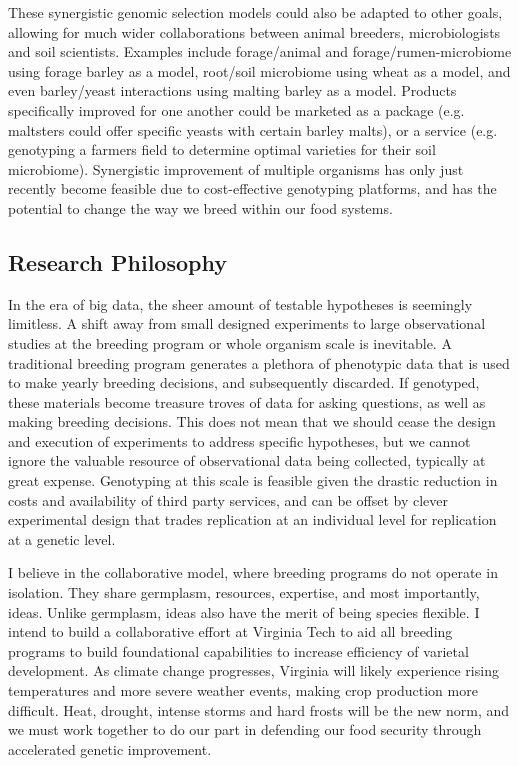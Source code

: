 \documentclass[11pt]{article}
\begin{document}
These synergistic genomic selection models could also be adapted to other goals, allowing for much wider collaborations between animal breeders, microbiologists and soil scientists. Examples include forage/animal and forage/rumen-microbiome using forage barley as a model, root/soil microbiome using wheat as a model, and even barley/yeast interactions using malting barley as a model. Products specifically improved for one another could be marketed as a package (e.g. maltsters could offer specific yeasts with certain barley malts), or a service (e.g. genotyping a farmers field to determine optimal varieties for their soil microbiome). Synergistic improvement of multiple organisms has only just recently become feasible due to cost-effective genotyping platforms, and has the potential to change the way we breed within our food systems. 



\subsection*{Research Philosophy}

In the era of big data, the sheer amount of testable hypotheses is seemingly limitless. A shift away from small designed experiments to large observational studies at the breeding program or whole organism scale is inevitable. A traditional breeding program generates a plethora of phenotypic data that is used to make yearly breeding decisions, and subsequently discarded. If genotyped, these materials become treasure troves of data for asking questions, as well as making breeding decisions. This does not mean that we should cease the design and execution of experiments to address specific hypotheses, but we cannot ignore the valuable resource of observational data being collected, typically at great expense. Genotyping at this scale is feasible given the drastic reduction in costs and availability of third party services, and can be offset by clever experimental design that trades replication at an individual level for replication at a genetic level.

I believe in the collaborative model, where breeding programs do not operate in isolation. They share germplasm, resources, expertise, and most importantly, ideas. Unlike germplasm, ideas also have the merit of being species flexible. I intend to build a collaborative effort at Virginia Tech to aid all breeding programs to build foundational capabilities to increase efficiency of varietal development. As climate change progresses, Virginia will likely experience rising temperatures and more severe weather events, making crop production more difficult. Heat, drought, intense storms and hard frosts will be the new norm, and we must work together to do our part in defending our food security through accelerated genetic improvement. 
\end{document}
